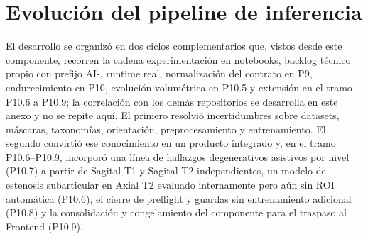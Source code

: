 \section{Evolución del pipeline de inferencia}
\label{anexo:f-evolucion-pipeline-inferencia}

El desarrollo se organizó en dos ciclos complementarios que, vistos desde este componente, recorren la cadena experimentación en notebooks, backlog técnico propio con prefijo AI-, runtime real, normalización del contrato en P9, endurecimiento en P10, evolución volumétrica en P10.5 y extensión en el tramo P10.6 a P10.9; la correlación con los demás repositorios se desarrolla en este anexo y no se repite aquí. El primero resolvió incertidumbres sobre datasets, máscaras, taxonomías, orientación, preprocesamiento y entrenamiento. El segundo convirtió ese conocimiento en un producto integrado y, en el tramo P10.6–P10.9, incorporó una línea de hallazgos degenerativos asistivos por nivel (P10.7) a partir de Sagital T1 y Sagital T2 independientes, un modelo de estenosis subarticular en Axial T2 evaluado internamente pero aún sin ROI automática (P10.6), el cierre de preflight y guardas sin entrenamiento adicional (P10.8) y la consolidación y congelamiento del componente para el traspaso al Frontend (P10.9).

